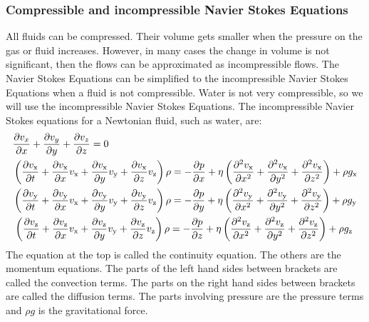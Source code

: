 \documentclass{article}
\begin{document}
\subsubsection{Compressible and incompressible Navier Stokes Equations}
All fluids can be compressed. Their volume gets smaller when the pressure on the gas or fluid increases. However, in many cases the change in volume is not significant, then the flows can be approximated as incompressible flows. The Navier Stokes Equations can be simplified to the incompressible Navier Stokes Equations when a fluid is not compressible. Water is not very compressible\cite{NSE features}, so we will use the incompressible Navier Stokes Equations. The incompressible Navier Stokes equations for a Newtonian fluid, such as water, are:\cite{Navier Stokes incompressible} \cite{NASA NSE}
\begin{equation}
\begin{aligned}
&\pdv{v_{x}}{x}+\pdv{v_{y}}{y}+\pdv{v_{z}}{z}=0\\
&\left(\frac{\partial v_{\mathrm{x}}}{\partial t}+\frac{\partial v_{\mathrm{x}}}{\partial x} v_{\mathrm{x}}+\frac{\partial v_{\mathrm{x}}}{\partial y} v_{\mathrm{y}}+\frac{\partial v_{\mathrm{x}}}{\partial z} v_{\mathrm{z}}\right) \rho=-\frac{\partial p}{\partial x}+\eta\left(\frac{\partial^{2} v_{\mathrm{x}}}{\partial x^{2}}+\frac{\partial^{2} v_{\mathrm{x}}}{\partial y^{2}}+\frac{\partial^{2} v_{\mathrm{x}}}{\partial z^{2}}\right)+\rho g_{\mathrm{x}}\\
&\left(\frac{\partial v_{\mathrm{y}}}{\partial t}+\frac{\partial v_{\mathrm{y}}}{\partial x} v_{\mathrm{x}}+\frac{\partial v_{\mathrm{y}}}{\partial y} v_{\mathrm{y}}+\frac{\partial v_{\mathrm{y}}}{\partial z} v_{\mathrm{z}}\right) \rho=-\frac{\partial p}{\partial y}+\eta\left(\frac{\partial^{2} v_{\mathrm{y}}}{\partial x^{2}}+\frac{\partial^{2} v_{\mathrm{y}}}{\partial y^{2}}+\frac{\partial^{2} v_{\mathrm{y}}}{\partial z^{2}}\right)+\rho g_{\mathrm{y}}\\
&\left . \left(\frac{\partial v_{\mathrm{z}}}{\partial t}+\frac{\partial v_{\mathrm{z}}}{\partial x} v_{\mathrm{x}}+\frac{\partial v_{\mathrm{z}}}{\partial y} v_{\mathrm{y}}+\frac{\partial v_{\mathrm{z}}}{\partial z} v_{\mathrm{z}}\right) \rho=-\frac{\partial p}{\partial z}+\eta\left(\frac{\partial^{2} v_{\mathrm{z}}}{\partial x^{2}}+\frac{\partial^{2} v_{\mathrm{z}}}{\partial y^{2}}+\frac{\partial^{2} v_{\mathrm{z}}}{\partial z^{2}}\right)+\rho g_{\mathrm{z}}\right .
\end{aligned}
\label{NSE incompressible}
\end{equation}
The equation at the top is called the continuity equation. The others are the momentum equations. The parts of the left hand sides between brackets are called the convection terms. The parts on the right hand sides between brackets are called the diffusion terms. The parts involving pressure are the pressure terms and \(\rho g\) is the gravitational force.
\end{document}
